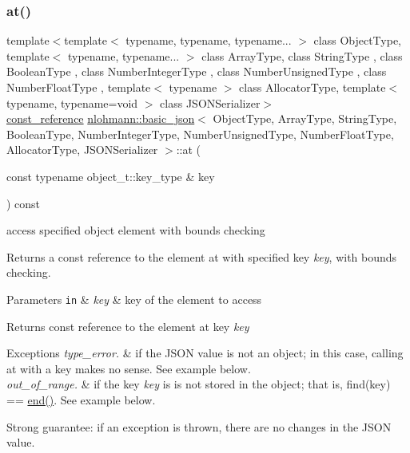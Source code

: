 \subsubsection{\texorpdfstring{at()}{at()}\hspace{0.1cm}{\footnotesize\ttfamily [4/6]}}
{\footnotesize\ttfamily template$<$template$<$ typename, typename, typename... $>$ class Object\+Type, template$<$ typename, typename... $>$ class Array\+Type, class String\+Type , class Boolean\+Type , class Number\+Integer\+Type , class Number\+Unsigned\+Type , class Number\+Float\+Type , template$<$ typename $>$ class Allocator\+Type, template$<$ typename, typename=void $>$ class J\+S\+O\+N\+Serializer$>$ \\
\hyperlink{classnlohmann_1_1basic__json_a4057c5425f4faacfe39a8046871786ca}{const\+\_\+reference} \hyperlink{classnlohmann_1_1basic__json}{nlohmann\+::basic\+\_\+json}$<$ Object\+Type, Array\+Type, String\+Type, Boolean\+Type, Number\+Integer\+Type, Number\+Unsigned\+Type, Number\+Float\+Type, Allocator\+Type, J\+S\+O\+N\+Serializer $>$\+::at (\begin{DoxyParamCaption}\item[{const typename object\+\_\+t\+::key\+\_\+type \&}]{key }\end{DoxyParamCaption}) const\hspace{0.3cm}{\ttfamily [inline]}}



access specified object element with bounds checking 

Returns a const reference to the element at with specified key {\itshape key}, with bounds checking.


\begin{DoxyParams}[1]{Parameters}
\mbox{\tt in}  & {\em key} & key of the element to access\\
\hline
\end{DoxyParams}
\begin{DoxyReturn}{Returns}
const reference to the element at key {\itshape key} 
\end{DoxyReturn}

\begin{DoxyExceptions}{Exceptions}
{\em type\+\_\+error.} & if the J\+S\+ON value is not an object; in this case, calling {\ttfamily at} with a key makes no sense. See example below. \\
\hline
{\em out\+\_\+of\+\_\+range.} & if the key {\itshape key} is is not stored in the object; that is, {\ttfamily find(key) == \hyperlink{classnlohmann_1_1basic__json_a13e032a02a7fd8a93fdddc2fcbc4763c}{end()}}. See example below.\\
\hline
\end{DoxyExceptions}
Strong guarantee\+: if an exception is thrown, there are no changes in the J\+S\+ON value.

